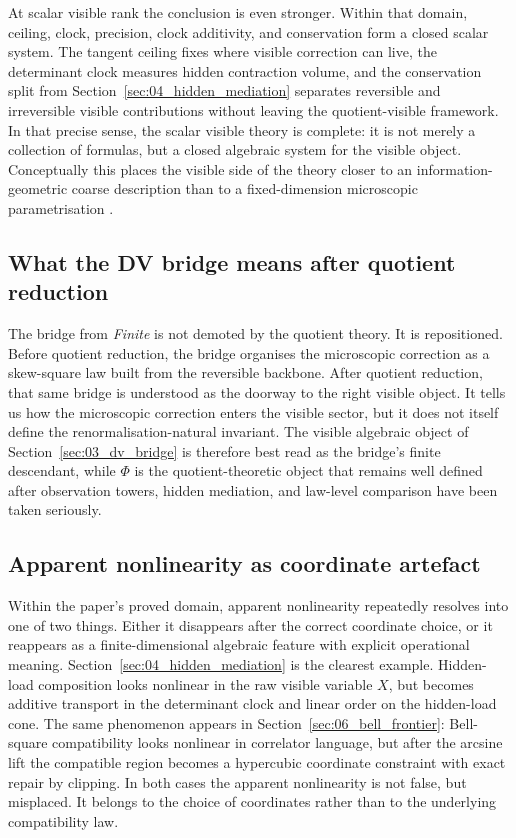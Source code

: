 \documentclass[11pt]{article}
\numberwithin{equation}{section}
\theoremstyle{thmcompact}
\theoremstyle{remark}
\begin{document}
At scalar visible rank the conclusion is even stronger. Within that domain, ceiling, clock, precision, clock additivity, and conservation form a closed scalar system. The tangent ceiling fixes where visible correction can live, the determinant clock measures hidden contraction volume, and the conservation split from Section~\ref{sec:04_hidden_mediation} separates reversible and irreversible visible contributions without leaving the quotient-visible framework. In that precise sense, the scalar visible theory is complete: it is not merely a collection of formulas, but a closed algebraic system for the visible object. Conceptually this places the visible side of the theory closer to an information-geometric coarse description than to a fixed-dimension microscopic parametrisation \cite{Rao1945,AmariNagaoka2000,AyJostLeSchwachhofer2017}.

\subsection{What the DV bridge means after quotient reduction}

The bridge from \emph{Finite} is not demoted by the quotient theory. It is repositioned. Before quotient reduction, the bridge organises the microscopic correction as a skew-square law built from the reversible backbone. After quotient reduction, that same bridge is understood as the doorway to the right visible object. It tells us how the microscopic correction enters the visible sector, but it does not itself define the renormalisation-natural invariant. The visible algebraic object of Section~\ref{sec:03_dv_bridge} is therefore best read as the bridge's finite descendant, while $\Phi$ is the quotient-theoretic object that remains well defined after observation towers, hidden mediation, and law-level comparison have been taken seriously.

\subsection{Apparent nonlinearity as coordinate artefact}

Within the paper's proved domain, apparent nonlinearity repeatedly resolves into one of two things. Either it disappears after the correct coordinate choice, or it reappears as a finite-dimensional algebraic feature with explicit operational meaning. Section~\ref{sec:04_hidden_mediation} is the clearest example. Hidden-load composition looks nonlinear in the raw visible variable $X$, but becomes additive transport in the determinant clock and linear order on the hidden-load cone. The same phenomenon appears in Section~\ref{sec:06_bell_frontier}: Bell-square compatibility looks nonlinear in correlator language, but after the arcsine lift the compatible region becomes a hypercubic coordinate constraint with exact repair by clipping. In both cases the apparent nonlinearity is not false, but misplaced. It belongs to the choice of coordinates rather than to the underlying compatibility law.
\end{document}
